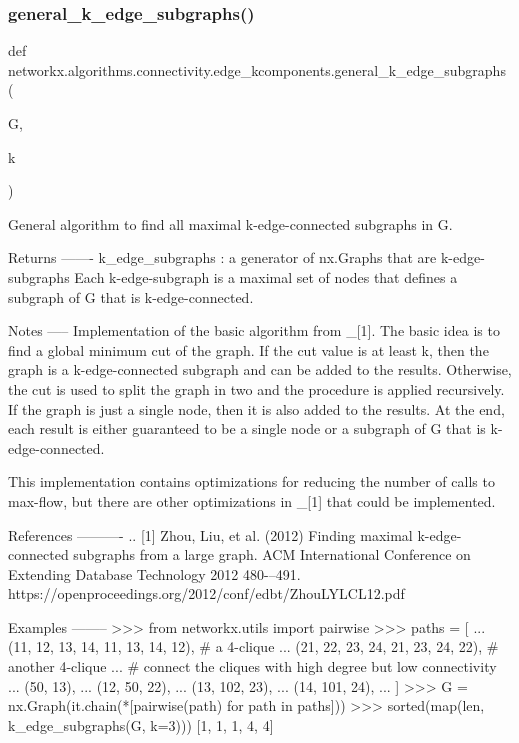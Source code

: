 \subsubsection{\texorpdfstring{general\+\_\+k\+\_\+edge\+\_\+subgraphs()}{general\_k\_edge\_subgraphs()}}
{\footnotesize\ttfamily def networkx.\+algorithms.\+connectivity.\+edge\+\_\+kcomponents.\+general\+\_\+k\+\_\+edge\+\_\+subgraphs (\begin{DoxyParamCaption}\item[{}]{G,  }\item[{}]{k }\end{DoxyParamCaption})}

\begin{DoxyVerb}General algorithm to find all maximal k-edge-connected subgraphs in G.

Returns
-------
k_edge_subgraphs : a generator of nx.Graphs that are k-edge-subgraphs
    Each k-edge-subgraph is a maximal set of nodes that defines a subgraph
    of G that is k-edge-connected.

Notes
-----
Implementation of the basic algorithm from _[1].  The basic idea is to find
a global minimum cut of the graph. If the cut value is at least k, then the
graph is a k-edge-connected subgraph and can be added to the results.
Otherwise, the cut is used to split the graph in two and the procedure is
applied recursively. If the graph is just a single node, then it is also
added to the results. At the end, each result is either guaranteed to be
a single node or a subgraph of G that is k-edge-connected.

This implementation contains optimizations for reducing the number of calls
to max-flow, but there are other optimizations in _[1] that could be
implemented.

References
----------
.. [1] Zhou, Liu, et al. (2012) Finding maximal k-edge-connected subgraphs
    from a large graph.  ACM International Conference on Extending Database
    Technology 2012 480-–491.
    https://openproceedings.org/2012/conf/edbt/ZhouLYLCL12.pdf

Examples
--------
>>> from networkx.utils import pairwise
>>> paths = [
...     (11, 12, 13, 14, 11, 13, 14, 12),  # a 4-clique
...     (21, 22, 23, 24, 21, 23, 24, 22),  # another 4-clique
...     # connect the cliques with high degree but low connectivity
...     (50, 13),
...     (12, 50, 22),
...     (13, 102, 23),
...     (14, 101, 24),
... ]
>>> G = nx.Graph(it.chain(*[pairwise(path) for path in paths]))
>>> sorted(map(len, k_edge_subgraphs(G, k=3)))
[1, 1, 1, 4, 4]
\end{DoxyVerb}
 \mbox{\label{namespacenetworkx_1_1algorithms_1_1connectivity_1_1edge__kcomponents_af6249ee7fb8d09fe3f506cdf57b5e8e3}} 
